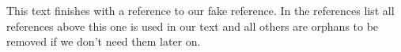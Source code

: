 
This text finishes with a reference to our fake reference.
In the references list all references above this one is used in our text and all others are orphans to be removed if we don't need them later on.\cite{fake}
\nocite{*}
